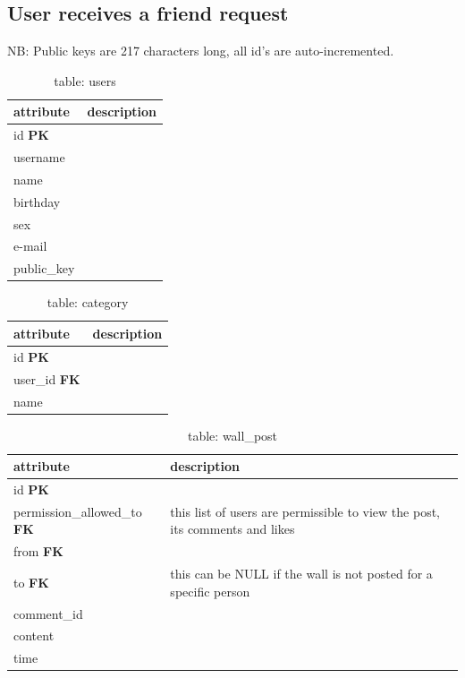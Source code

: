 \subsection{User receives a friend request}

NB: Public keys are 217 characters long, all id's are auto-incremented.

\begin{table}[h]
    \centering
    \begin{tabular}{ll}
    attribute      & description\\ \hline
    id \textbf{PK} & \\
    username       & \\
    name           & \\
    birthday       & \\
    sex            & \\
    e-mail         & \\
    public\_key    & \\
    \end{tabular}
    \caption{table: users}
\end{table}

\begin{table}[h]
    \centering
    \begin{tabular}{ll}
    attribute            & description\\ \hline
    id \textbf{PK}       & \\
    user\_id \textbf{FK} & \\
    name                 & \\
    \end{tabular}
    \caption{table: category}
\end{table}

\begin{table}[h]
    \centering
    \begin{tabular}{ll}
    attribute                           & description\\ \hline
    id \textbf{PK}                      & \\
    permission\_allowed\_to \textbf{FK} & this list of users are permissible to view the post, its comments and likes\\
    from \textbf{FK}                    & \\
    to \textbf{FK}                      & this can be NULL if the wall is not posted for a specific person\\
    comment\_id                         & \\
    content                             & \\
    time                                & \\
    \end{tabular}
    \caption{table: wall\_post}
\end{table}

